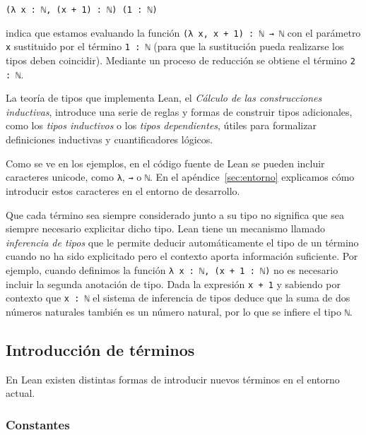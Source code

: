 \begin{itemize}[topsep=0pt]
	      \begin{lstlisting}
(λ x : ℕ, (x + 1) : ℕ) (1 : ℕ)              
\end{lstlisting}

	      indica que estamos evaluando la función \lstinline{(λ x, x + 1) : ℕ → ℕ} con el parámetro \lstinline{x} sustituido por el término
	      \lstinline{1 : ℕ} (para que la sustitución pueda realizarse los tipos
	      deben coincidir). Mediante un proceso de reducción se obtiene el
	      término \lstinline{2 : ℕ}.

\end{itemize}

La teoría de tipos que implementa Lean, el \textit{Cálculo de las
	construcciones inductivas}, introduce una serie de reglas y formas de construir
tipos adicionales, como los \textit{tipos inductivos} o los \textit{tipos
	dependientes}, útiles para formalizar definiciones inductivas y cuantificadores
lógicos.

Como se ve en los ejemplos, en el código fuente de Lean se pueden incluir
caracteres unicode, como \lstinline{λ}, \lstinline{→} o \lstinline{ℕ}.
En el apéndice~\ref{sec:entorno} explicamos cómo introducir estos caracteres
en el entorno de desarrollo.

Que cada término sea siempre considerado junto a su tipo no significa que sea
siempre necesario explicitar dicho tipo. Lean tiene un mecanismo llamado
\textit{inferencia de tipos} que le permite deducir automáticamente el tipo de
un término cuando no ha sido explicitado pero el contexto aporta información
suficiente.
Por ejemplo, cuando definimos la función \lstinline{λ x : ℕ, (x + 1 : ℕ)} no es
necesario incluir la segunda anotación de tipo. Dada la expresión
\lstinline{x + 1} y sabiendo por contexto que \lstinline{x : ℕ} el sistema de
inferencia de tipos deduce que la suma de dos números naturales también es un
número natural, por lo que se infiere el tipo \lstinline{ℕ}.

\subsection{Introducci\'{o}n de t\'{e}rminos}

En Lean existen distintas formas de introducir nuevos términos en el entorno
actual.

\subsubsection*{Constantes}%

